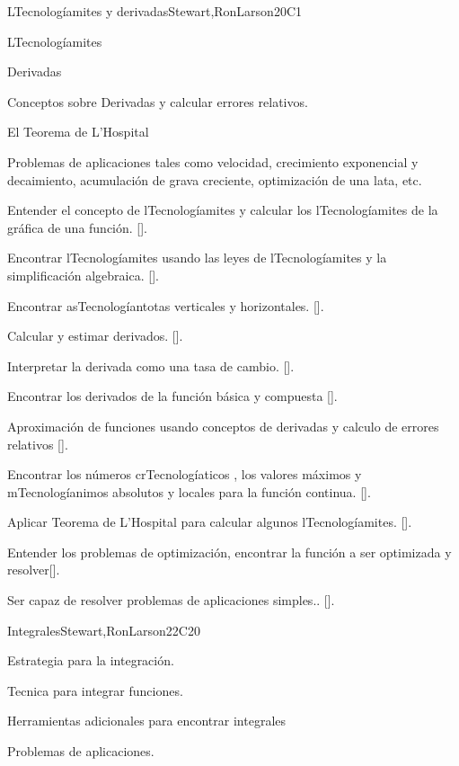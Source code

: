\begin{syllabus}
\begin{unit}{LTecnologíamites y derivadas}{}{Stewart,RonLarson}{20}{C1}
   \begin{topics}
      \item LTecnologíamites
      \item Derivadas
      \item Conceptos sobre Derivadas y calcular errores relativos.
      \item El Teorema de L'Hospital
      \item Problemas de aplicaciones tales como velocidad, crecimiento exponencial y decaimiento, acumulación de grava creciente, optimización de una lata, etc.
   \end{topics}

   \begin{learningoutcomes}
      \item Entender el concepto de lTecnologíamites y calcular los lTecnologíamites de la gráfica de una función. [\Assessment].
      \item Encontrar lTecnologíamites usando las leyes de lTecnologíamites y la simplificación algebraica. [\Assessment].
      \item Encontrar asTecnologíantotas verticales y horizontales. [\Assessment].
      \item Calcular y estimar derivados. [\Assessment].
      \item Interpretar la derivada como una tasa de cambio. [\Assessment].
      \item Encontrar los derivados de la función básica y compuesta [\Assessment].
      \item Aproximación de  funciones usando conceptos de  derivadas y calculo de  errores relativos [\Assessment].
      \item Encontrar los números crTecnologíaticos , los valores máximos y mTecnologíanimos absolutos y locales para la función continua. [\Assessment].
      \item Aplicar Teorema de L'Hospital para calcular algunos lTecnologíamites. [\Assessment].
      \item Entender los problemas de optimización, encontrar la función a ser optimizada y resolver[\Assessment].
      \item Ser capaz de resolver problemas de aplicaciones simples.. [\Assessment].
        \end{learningoutcomes}
\end{unit}

\begin{unit}{Integrales}{}{Stewart,RonLarson}{22}{C20}
   \begin{topics}
    \item Estrategia para la integración.
    \item Tecnica para integrar funciones.
    \item Herramientas adicionales para encontrar integrales
    \item Problemas de aplicaciones.


\end{topics}
\end{unit}
\end{syllabus}
